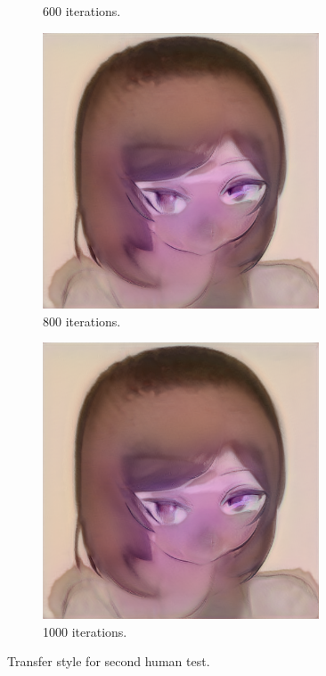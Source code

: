\documentclass[conference]{IEEEtran}
\theoremstyle{definition}
\theoremstyle{remark}
\theoremstyle{remark}
\begin{document}
\begin{figure}
\begin{subfigure}[b]{0.15\textwidth}
    \caption{600 iterations.}
  \end{subfigure}
  \begin{subfigure}[b]{0.15\textwidth}
    \centering \includegraphics[width=0.9\textwidth]{figs/anime-js-4.png}
    \caption{800 iterations.}
  \end{subfigure}
  \begin{subfigure}[b]{0.15\textwidth}
    \centering \includegraphics[width=0.9\textwidth]{figs/anime-js-5.png}
    \caption{1000 iterations.}
  \end{subfigure}
  \caption{Transfer style for second human test.}
  \label{fig:ts-anime2}
\end{figure}
\end{document}
